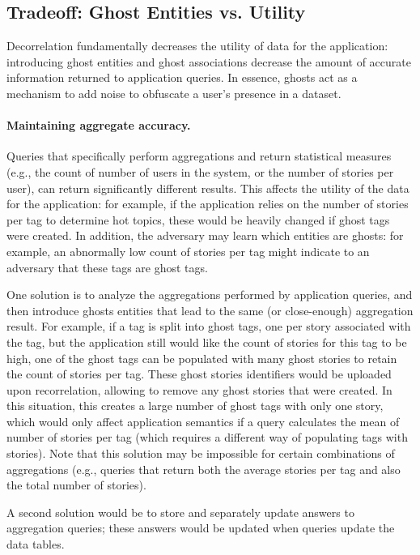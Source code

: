 \subsection{Tradeoff: Ghost Entities vs. Utility}
Decorrelation fundamentally decreases the utility of data for the application: introducing
ghost entities and ghost associations decrease the amount of accurate information returned to
application queries. In essence, ghosts act as a mechanism to add noise to obfuscate a user's
presence in a dataset.

\paragraph{Maintaining aggregate accuracy.}
Queries that specifically perform aggregations and return statistical measures (e.g.,
the count of number of users in the system, or the number of stories per user), can return
significantly different results. This affects the utility of the data for the application: for
example, if the application relies on the number of stories per tag to determine hot topics, these
would be heavily changed if ghost tags were created.  In addition, the adversary may learn which
entities are ghosts: for example, an abnormally low count of stories per tag might indicate to an
adversary that these tags are ghost tags.  

One solution is to analyze the aggregations performed by application queries, and then
introduce ghosts entities that lead to the same (or close-enough) aggregation result. For example,
if a tag is split into ghost tags, one per story associated with the tag, but the application still
would like the count of stories for this tag to be high, one of the ghost tags can be populated with
many ghost stories to retain the count of stories per tag. These ghost stories identifiers would be
uploaded upon recorrelation, allowing \sys{} to remove any ghost stories that were created. In this
situation, this creates a large number of ghost tags with only one story, which would only affect
application semantics if a query calculates the mean of number of stories per tag (which requires a
different way of populating tags with stories). Note that this solution may be impossible for  
certain combinations of aggregations (e.g., queries that return both the average stories per tag and also
the total number of stories).

A second solution would be to store and separately update answers to aggregation queries;
these answers would be updated when queries update the data tables.


